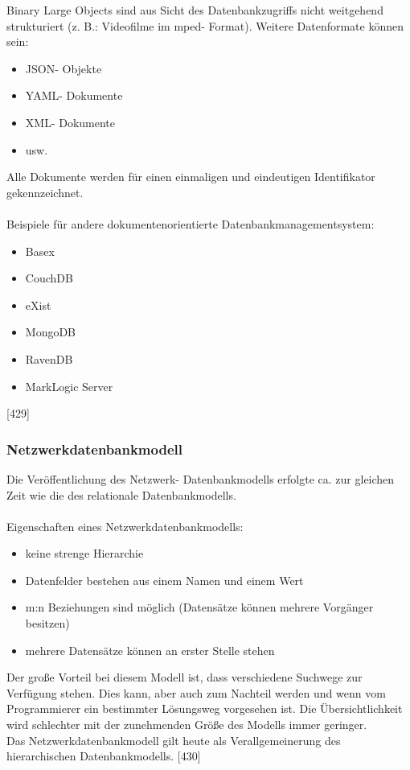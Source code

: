 \documentclass[12pt,a4paper]{report}
\begin{document}
\begin{onehalfspace}
Binary Large Objects sind aus Sicht des Datenbankzugriffs nicht weitgehend strukturiert (z. B.: Videofilme im mped- Format). Weitere Datenformate können sein:
\begin{itemize}
\item JSON- Objekte
\item YAML- Dokumente
\item XML- Dokumente
\item usw.
\end{itemize}
Alle Dokumente werden für einen einmaligen und eindeutigen Identifikator gekennzeichnet.\\
\\Beispiele für andere dokumentenorientierte Datenbankmanagementsystem:
\begin{itemize}
\item Basex
\item CouchDB
\item eXist
\item MongoDB
\item RavenDB
\item MarkLogic Server
\end{itemize}
[429]
\subsubsection{Netzwerkdatenbankmodell}
Die Veröffentlichung des Netzwerk- Datenbankmodells erfolgte ca. zur gleichen Zeit wie die des relationale Datenbankmodells.\\
\\Eigenschaften eines Netzwerkdatenbankmodells:
\begin{itemize}
\item keine strenge Hierarchie
\item Datenfelder bestehen aus einem Namen und einem Wert
\item m:n Beziehungen sind möglich (Datensätze können mehrere Vorgänger besitzen)
\item mehrere Datensätze können an erster Stelle stehen
\end{itemize}
Der große Vorteil bei diesem Modell ist, dass verschiedene Suchwege zur Verfügung stehen. Dies kann, aber auch zum Nachteil werden und wenn vom Programmierer ein bestimmter Lösungsweg vorgesehen ist. Die Übersichtlichkeit wird schlechter mit der zunehmenden Größe des Modells immer geringer.\\

Das Netzwerkdatenbankmodell gilt heute als Verallgemeinerung des hierarchischen Datenbankmodells. [430]


\end{onehalfspace}
\end{document}
